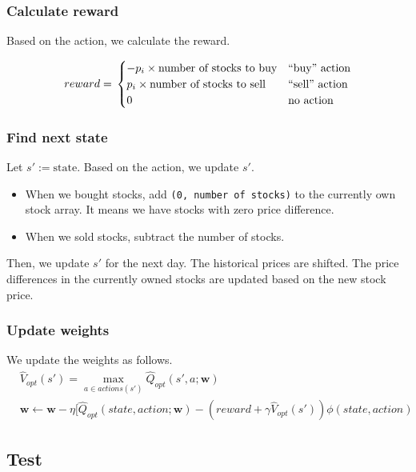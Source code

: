 \documentclass[12pt]{article}
\newcommand{\vect}[1]{\boldsymbol{#1}}
\begin{document}
\subsubsection*{Calculate reward}

Based on the action, we calculate the reward.

\[
  reward = \\
  \begin{cases}
    -p_i \times \text{number of stocks to buy} & \text{``buy'' action} \\
    p_i \times \text{number of stocks to sell} & \text{``sell'' action} \\
    0 & \text{no action} \\
  \end{cases}
\]

\subsubsection*{Find next state}

Let $s' := \text{state}$. Based on the action, we update $s'$.

\begin{itemize}
\item When we bought stocks, add \verb|(0, number of stocks)| to
  the currently own stock array. It means we have stocks with zero
  price difference.
  \item When we sold stocks, subtract the number of stocks.
\end{itemize}

Then, we update $s'$ for the next day. The historical prices are
shifted. The price differences in the currently owned stocks are
updated based on the new stock price.

\subsubsection*{Update weights}

We update the weights as follows.
\begin{align*}
&\hat{V}_{opt}(s') = \max_{a \in actions(s')}\hat{Q}_{opt}(s', a;\vect{w}) \\
&\vect{w} \leftarrow \vect{w} - \eta[\hat{Q}_{opt}(state, action;\vect{w}) - (reward + \gamma \hat{V}_{opt}(s'))\phi(state,action)
\end{align*}

\subsection{Test}
\end{document}
